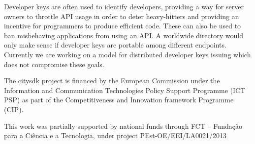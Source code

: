 \documentclass[times]{ettauth}
\begin{document}
Developer keys are often used to identify developers, providing a way for server owners to throttle API usage in order to deter heavy-hitters and providing an incentive for programmers to produce efficient code.
These can also be used to ban misbehaving applications from using an API.
A worldwide directory would only make sense if developer keys are portable among different endpoints.
Currently we are working on a model for distributed developer keys issuing which does not compromise these goals.


\acks
The \ac{citysdk} project is financed by the European Commission under the Information and Communication Technologies Policy Support Programme (ICT PSP) as part of the Competitiveness and Innovation framework Programme (CIP).

This work was partially supported by national funds through FCT – Funda\c c\~ao para a Ci\^encia e a Tecnologia, under project PEst-OE/EEI/LA0021/2013



\end{document}
